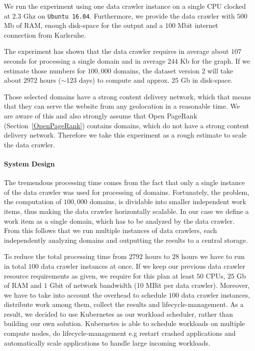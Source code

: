 We run the experiment using one data crawler instance on a single CPU clocked at $2.3$ Ghz on \texttt{Ubuntu 16.04}. Furthermore, we provide the data crawler with $500$ Mb of RAM, enough disk-space for the output and a $100$ Mbit internet connection from Karlsruhe.

The experiment has shown that the data crawler requires in average about $107$ seconds for processing a single domain and in average $244$ Kb for the graph. If we estimate those numbers for $100,000$ domains, the dataset version 2 will take about $2972$ hours ($\sim 123$ days) to compute and approx. $25$ Gb in disk-space.

Those selected domains have a strong content delivery network, which that means that they can serve the website from any geolocation in a reasonable time. We are aware of this and also strongly assume that Open PageRank (Section~\ref{OpenPageRank}) contains domains, which do not have a strong content delivery network. Therefore we take this experiment as a rough estimate to scale the data crawler.

\paragraph*{System Design}
\label{datacrawler_scale_architecture}
The tremendous processing time comes from the fact that only a single instance of the data crawler was used for processing of domains. Fortunately, the problem, the computation of $100,000$ domains, is dividable into smaller independent work items, thus making the data crawler horizontally scalable. In our case we define a work item as a single domain, which has to be analyzed by the data crawler. From this follows that we run multiple instances of data crawlers, each independently analyzing domains and outputting the results to a central storage.

To reduce the total processing time from $2792$ hours to $28$ hours we have to run in total $100$ data crawler instances at once. If we keep our previous data crawler resource requirements as given, we require for this plan at least $50$ CPUs, $25$ Gb of RAM and $1$ Gbit of network bandwidth (10 MBit per data crawler). Moreover, we have to take into account the overhead to schedule $100$ data crawler instances, distribute work among them, collect the results and lifecycle-management. As a result, we decided to use Kubernetes as our workload scheduler, rather than building our own solution. Kubernetes is able to schedule workloads on multiple compute nodes, do lifecycle-management e.g restart crashed applications and automatically scale applications to handle large incoming workloads.

